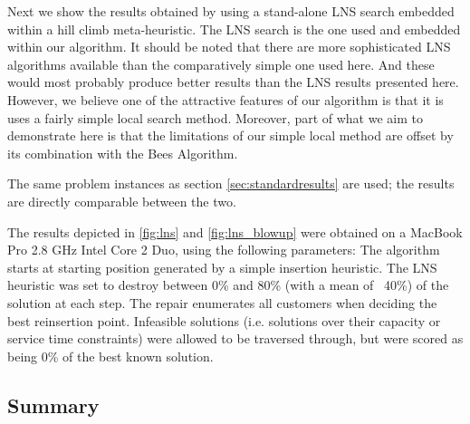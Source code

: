 Next we show the results obtained by using a stand-alone LNS search embedded within a hill climb meta-heuristic. The LNS search is the one used and embedded within our algorithm. It should be noted that there are more sophisticated LNS algorithms available than the comparatively simple one used here. And these would most probably produce better results than the LNS results presented here. However, we believe one of the attractive features of our algorithm is that it is uses a fairly simple local search method. Moreover, part of what we aim to demonstrate here is that the limitations of our simple local method are offset by its combination with the Bees Algorithm.

The same problem instances as section \ref{sec:standardresults} are used; the results are directly comparable between the two.



The results depicted in \ref{fig:lns} and \ref{fig:lns_blowup} were obtained on a MacBook Pro 2.8 GHz Intel Core 2 Duo, using the following parameters: The algorithm starts at starting position generated by a simple insertion heuristic. The LNS heuristic was set to destroy between 0\% and 80\% (with a mean of ~40\%) of the solution at each step. The repair enumerates all customers when deciding the best reinsertion point. Infeasible solutions (i.e. solutions over their capacity or service time constraints) were allowed to be traversed through, but were scored as being 0\% of the best known solution.

\subsection{Summary}

